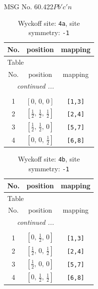 \documentclass[fleqn,8pt]{jsarticle}
\begin{document}
\setcounter{MaxMatrixCols}{32}

\renewcommand{\tablename}{Table~}
\renewcommand{\figurename}{Figure~}
\begin{center}
\LARGE
MSG No. 60.422\quad$Pb'c'n$
\end{center}
\renewcommand{\arraystretch}{1.2}
\begin{longtable}{ccc}
\caption{Wyckoff site: {\tt 4a}, site symmetry: {\tt -1}}
 \\
 \hline \hline
No. & position & mapping \\ \hline \endfirsthead

\multicolumn{2}{l}{\tablename\ \thetable{}} \\
 \hline \hline
No. & position & mapping \\ \hline \endhead

 \hline \hline
\multicolumn{2}{r}{\footnotesize\it continued ...} \\ \endfoot

 \hline \hline
\multicolumn{2}{r}{} \\ \endlastfoot

1 & $\left[ 0,\, 0,\, 0 \right]$ & {\tt [1,3]} \\ \hline
2 & $\left[ \frac{1}{2},\, \frac{1}{2},\, \frac{1}{2} \right]$ & {\tt [2,4]} \\ \hline
3 & $\left[ \frac{1}{2},\, \frac{1}{2},\, 0 \right]$ & {\tt [5,7]} \\ \hline
4 & $\left[ 0,\, 0,\, \frac{1}{2} \right]$ & {\tt [6,8]} \\
\end{longtable}
\renewcommand{\arraystretch}{1.2}
\begin{longtable}{ccc}
\caption{Wyckoff site: {\tt 4b}, site symmetry: {\tt -1}}
 \\
 \hline \hline
No. & position & mapping \\ \hline \endfirsthead

\multicolumn{2}{l}{\tablename\ \thetable{}} \\
 \hline \hline
No. & position & mapping \\ \hline \endhead

 \hline \hline
\multicolumn{2}{r}{\footnotesize\it continued ...} \\ \endfoot

 \hline \hline
\multicolumn{2}{r}{} \\ \endlastfoot

1 & $\left[ 0,\, \frac{1}{2},\, 0 \right]$ & {\tt [1,3]} \\ \hline
2 & $\left[ \frac{1}{2},\, 0,\, \frac{1}{2} \right]$ & {\tt [2,4]} \\ \hline
3 & $\left[ \frac{1}{2},\, 0,\, 0 \right]$ & {\tt [5,7]} \\ \hline
4 & $\left[ 0,\, \frac{1}{2},\, \frac{1}{2} \right]$ & {\tt [6,8]} \\
\end{longtable}
\end{document}
